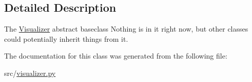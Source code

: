\subsection{Detailed Description}
The \hyperlink{classMain__PDE__Repo_1_1src_1_1visualizer_1_1Visualizer}{Visualizer} abstract baseclass Nothing is in it right now, but other classes could potentially inherit things from it. 

The documentation for this class was generated from the following file\+:\begin{DoxyCompactItemize}
\item 
src/\hyperlink{visualizer_8py}{visualizer.\+py}\end{DoxyCompactItemize}
